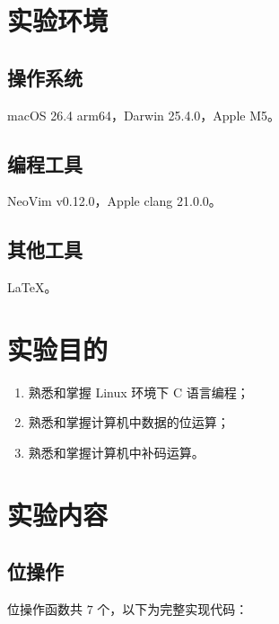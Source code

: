 \documentclass[12pt, a4paper]{academics}
\begin{document}
\makeacademicscover

\section{实验环境}

\subsection{操作系统}

macOS 26.4 arm64，Darwin 25.4.0，Apple M5。

\subsection{编程工具}

NeoVim v0.12.0，Apple clang 21.0.0。

\subsection{其他工具}

\LaTeX{}。

\section{实验目的}

\begin{enumerate}
    \item 熟悉和掌握 Linux 环境下 C 语言编程；
    \item 熟悉和掌握计算机中数据的位运算；
    \item 熟悉和掌握计算机中补码运算。
\end{enumerate}

\section{实验内容}

\subsection{位操作}

位操作函数共 $7$ 个，以下为完整实现代码：
\end{document}
